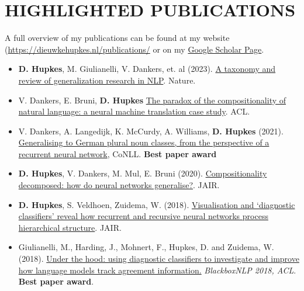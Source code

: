 \section{HIGHLIGHTED PUBLICATIONS}

A full overview of my publications can be found at my website (\textcolor{blue}{\url{https://dieuwkehupkes.nl/publications/}} or on my \textcolor{blue}{\href{https://scholar.google.com/citations?user=tAtSMTcAAAAJ&hl=en&oi=ao}{Google Scholar Page}}.\\

\begin{itemize}
\setlength\itemsep{5pt}
\item \textbf{D. Hupkes}, M. Giulianelli, V. Dankers, et. al (2023). \href{https://www.nature.com/articles/s42256-023-00729-y}{A taxonomy and review of generalization research in NLP}. Nature.
\item V. Dankers, E. Bruni, \textbf{D. Hupkes} \href{https://aclanthology.org/2022.acl-long.286/}{The paradox of the compositionality of natural language: a neural machine translation case study}. ACL.
\item V. Dankers, A. Langedijk, K. McCurdy, A. Williams, \textbf{D. Hupkes} (2021). \href{https://aclanthology.org/2021.conll-1.8/}{Generalising to German plural noun classes, from the perspective of a recurrent neural network}, CoNLL. \textbf{Best paper award}
\item \textbf{D. Hupkes}, V. Dankers, M. Mul, E. Bruni (2020). \href{https://www.jair.org/index.php/jair/article/view/11674/26576}{Compositionality decomposed:  how do neural networks generalise?}. JAIR.
\item \textbf{D. Hupkes}, S. Veldhoen, Zuidema, W. (2018). \href{https://jair.org/index.php/jair/article/view/11196/26408}{Visualisation and ‘diagnostic classifiers’ reveal how recurrent and recursive neural networks process hierarchical structure}. JAIR.
    \item Giulianelli, M., Harding, J., Mohnert, F., Hupkes, D. and Zuidema, W. (2018). \href{https://aclweb.org/anthology/W18-5426}{Under the hood: using diagnostic classifiers to investigate and improve how language models track agreement information.} \textit{BlackboxNLP 2018, ACL}. \textbf{Best paper award}.
\end{itemize}
